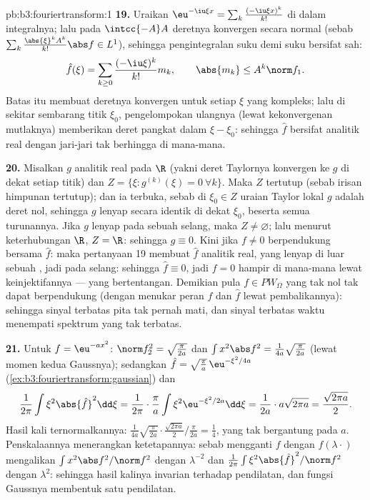 \begin{solution}{pb:b3:fouriertransform:1}
\textbf{19.} Uraikan $\eu^{-\iu\xi x} =
\sum_k\frac{(-\iu\xi x)^k}{k!}$ di dalam integralnya; lalu pada
$\intcc{-A}A$ deretnya konvergen secara normal
(sebab $\sum_k\frac{\abs{\xi}^kA^k}{k!}\abs f \in L^1$), sehingga
pengintegralan suku demi suku bersifat sah:
\[
\hat f(\xi) = \sum_{k\geq0}\frac{(-\iu\xi)^k}{k!}m_k,
\qquad \abs{m_k} \leq A^k\norm f_1 .
\]
Batas itu membuat deretnya konvergen untuk setiap $\xi$ yang kompleks;
lalu di sekitar sembarang titik $\xi_0$, pengelompokan ulangnya (lewat kekonvergenan mutlaknya)
memberikan deret pangkat dalam $\xi - \xi_0$: sehingga $\hat f$ bersifat
analitik real dengan jari-jari tak berhingga di mana-mana.

\textbf{20.} Misalkan $g$ analitik real pada $\R$ (yakni deret Taylornya
konvergen ke $g$ di dekat setiap titik) dan $Z = \{\xi :
g^{(k)}(\xi) = 0\ \forall k\}$. Maka $Z$ tertutup (sebab irisan
himpunan tertutup); dan ia terbuka, sebab di $\xi_0 \in Z$ uraian
Taylor lokal $g$ adalah deret nol, sehingga $g$ lenyap
secara identik di dekat $\xi_0$, beserta semua turunannya. Jika
$g$ lenyap pada sebuah selang, maka $Z \neq \varnothing$; lalu menurut
keterhubungan $\R$, $Z = \R$: sehingga $g \equiv 0$. Kini jika $f
\neq 0$ berpendukung  bersama $\hat f$: maka pertanyaan
19 membuat $\hat f$ analitik real, yang lenyap di luar sebuah ,
jadi pada selang: sehingga $\hat f \equiv 0$, jadi $f = 0$ hampir di mana-mana lewat
keinjektifannya --- yang bertentangan. Demikian pula $f \in
PW_\Omega$ yang tak nol tak dapat berpendukung  (dengan menukar peran
$f$ dan $\hat f$ lewat pembalikannya): sehingga sinyal terbatas pita tak pernah
mati, dan sinyal terbatas waktu menempati spektrum yang tak terbatas.

\textbf{21.} Untuk $f = \eu^{-ax^2}$: $\norm f_2^2 =
\sqrt{\frac\pi{2a}}$ dan $\int x^2\abs f^2 =
\frac1{4a}\sqrt{\frac{\pi}{2a}}$ (lewat momen kedua Gaussnya);
sedangkan $\hat f = \sqrt{\frac\pi a}\,\eu^{-\xi^2/4a}$
(\cref{ex:b3:fouriertransform:gaussian}) dan
\[
\frac1{2\pi}\int\xi^2\abs{\hat f}^2\dd\xi =
\frac1{2\pi}\cdot\frac\pi a\int\xi^2
\eu^{-\xi^2/2a}\dd\xi = \frac1{2a}\cdot a\sqrt{2\pi a}
= \frac{\sqrt{2\pi a}}2 .
\]
Hasil kali ternormalkannya: $\frac1{4a}\sqrt{\frac\pi{2a}}\cdot
\frac{\sqrt{2\pi a}}2\big/\frac{\pi}{2a} = \frac14$,
yang tak bergantung pada $a$. Penskalaannya menerangkan ketetapannya: sebab mengganti
$f$ dengan $f(\lambda\cdot)$ mengalikan $\int x^2\abs f^2/\norm
f^2$ dengan $\lambda^{-2}$ dan $\frac1{2\pi}\int\xi^2\abs{\hat
f}^2/\norm f^2$ dengan $\lambda^{2}$: sehingga hasil kalinya invarian terhadap
pendilatan, dan fungsi Gaussnya membentuk satu  pendilatan.


\end{solution}
